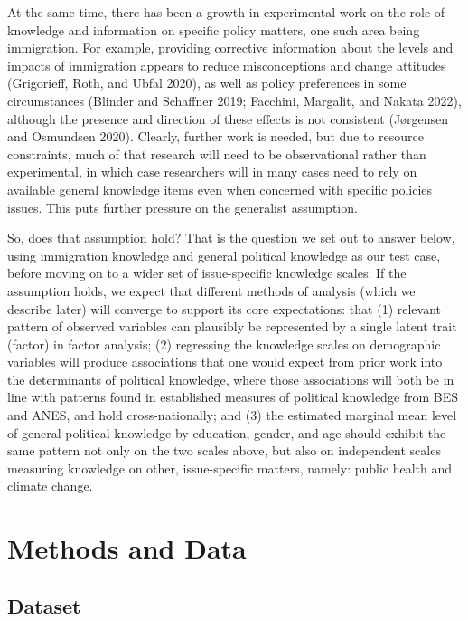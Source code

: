 \documentclass[11pt,halfline,a4paper,]{ouparticle}
\begin{document}
At the same time, there has been a growth in experimental work on the
role of knowledge and information on specific policy matters, one such
area being immigration. For example, providing corrective information
about the levels and impacts of immigration appears to reduce
misconceptions and change attitudes (Grigorieff, Roth, and Ubfal 2020),
as well as policy preferences in some circumstances (Blinder and
Schaffner 2019; Facchini, Margalit, and Nakata 2022), although the
presence and direction of these effects is not consistent (Jørgensen and
Osmundsen 2020). Clearly, further work is needed, but due to resource
constraints, much of that research will need to be observational rather
than experimental, in which case researchers will in many cases need to
rely on available general knowledge items even when concerned with
specific policies issues. This puts further pressure on the generalist
assumption.

So, does that assumption hold? That is the question we set out to answer
below, using immigration knowledge and general political knowledge as
our test case, before moving on to a wider set of issue-specific
knowledge scales. If the assumption holds, we expect that different
methods of analysis (which we describe later) will converge to support
its core expectations: that (1) relevant pattern of observed variables
can plausibly be represented by a single latent trait (factor) in factor
analysis; (2) regressing the knowledge scales on demographic variables
will produce associations that one would expect from prior work into the
determinants of political knowledge, where those associations will both
be in line with patterns found in established measures of political
knowledge from BES and ANES, and hold cross-nationally; and (3) the
estimated marginal mean level of general political knowledge by
education, gender, and age should exhibit the same pattern not only on
the two scales above, but also on independent scales measuring knowledge
on other, issue-specific matters, namely: public health and climate
change.

\hypertarget{methods-and-data}{%
\section{Methods and Data}\label{methods-and-data}}

\hypertarget{dataset}{%
\subsection{Dataset}\label{dataset}}
\end{document}
